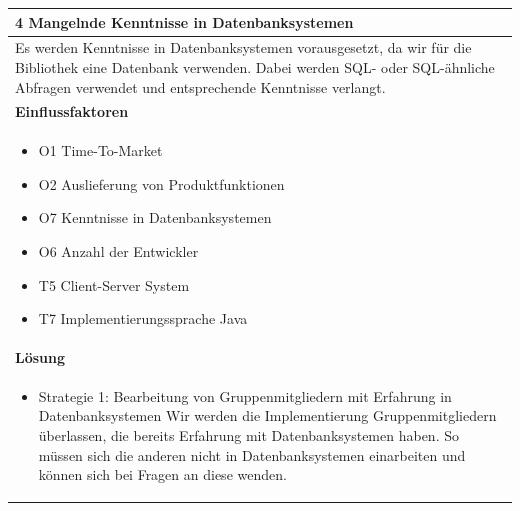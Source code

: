 \documentclass[fontsize=12pt,paper=a4,twoside]{scrartcl}
\begin{document}
\begin{table}[H]
\begin{tabular}{|p{\textwidth}|}\hline
4 Mangelnde Kenntnisse in Datenbanksystemen\\ \hline
Es werden Kenntnisse in Datenbanksystemen vorausgesetzt, da wir für die Bibliothek eine Datenbank verwenden. Dabei werden SQL- oder SQL-ähnliche Abfragen verwendet und entsprechende Kenntnisse verlangt. \\ \hline
\textbf{Einflussfaktoren}\\
\begin{itemize}
\item O1 Time-To-Market
\item O2 Auslieferung von Produktfunktionen
\item O7 Kenntnisse in Datenbanksystemen
\item O6 Anzahl der Entwickler
\item T5 Client-Server System
\item T7 Implementierungssprache Java
\end{itemize}\\ \hline
\textbf{Lösung}\\
\begin{itemize}
\item Strategie 1: Bearbeitung von Gruppenmitgliedern mit Erfahrung in Datenbanksystemen \leavevmode\newline
Wir werden die Implementierung Gruppenmitgliedern überlassen, die bereits Erfahrung mit Datenbanksystemen haben. So müssen sich die anderen nicht in Datenbanksystemen einarbeiten und können sich bei Fragen an diese wenden.
\end{itemize}\\ \hline
\end{tabular}
\end{table}
\end{document}
